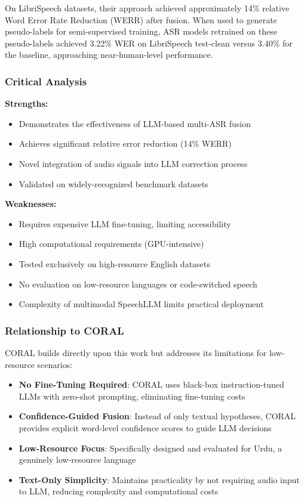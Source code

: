 On LibriSpeech datasets, their approach achieved approximately 14\% relative Word Error Rate Reduction (WERR) after fusion. When used to generate pseudo-labels for semi-supervised training, ASR models retrained on these pseudo-labels achieved 3.22\% WER on LibriSpeech test-clean versus 3.40\% for the baseline, approaching near-human-level performance.

\subsubsection{Critical Analysis}

\textbf{Strengths:}
\begin{itemize}[topsep=4pt,itemsep=2pt]
    \item Demonstrates the effectiveness of LLM-based multi-ASR fusion
    \item Achieves significant relative error reduction (14\% WERR)
    \item Novel integration of audio signals into LLM correction process
    \item Validated on widely-recognized benchmark datasets
\end{itemize}

\textbf{Weaknesses:}
\begin{itemize}[topsep=4pt,itemsep=2pt]
    \item Requires expensive LLM fine-tuning, limiting accessibility
    \item High computational requirements (GPU-intensive)
    \item Tested exclusively on high-resource English datasets
    \item No evaluation on low-resource languages or code-switched speech
    \item Complexity of multimodal SpeechLLM limits practical deployment
\end{itemize}

\subsubsection{Relationship to CORAL}

CORAL builds directly upon this work but addresses its limitations for low-resource scenarios:

\begin{itemize}[topsep=4pt,itemsep=2pt]
    \item \textbf{No Fine-Tuning Required}: CORAL uses black-box instruction-tuned LLMs with zero-shot prompting, eliminating fine-tuning costs
    \item \textbf{Confidence-Guided Fusion}: Instead of only textual hypotheses, CORAL provides explicit word-level confidence scores to guide LLM decisions
    \item \textbf{Low-Resource Focus}: Specifically designed and evaluated for Urdu, a genuinely low-resource language
    \item \textbf{Text-Only Simplicity}: Maintains practicality by not requiring audio input to LLM, reducing complexity and computational costs
\end{itemize}


